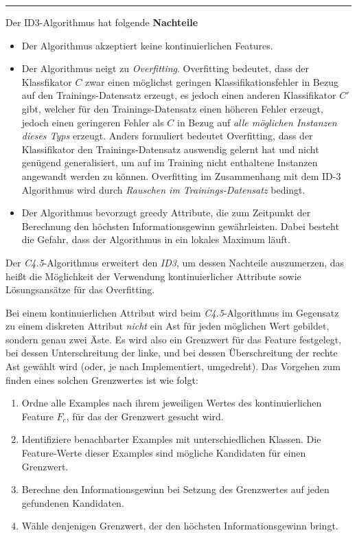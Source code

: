 \noindent\rule{\linewidth}{0.3pt}

\vspace{5mm}

Der ID3-Algorithmus hat folgende \textbf{Nachteile}
\begin{itemize}
\item Der Algorithmus akzeptiert keine kontinuierlichen Features.\cite[S. 72]{machine_mitchell}
\item Der Algorithmus neigt zu \emph{Overfitting}. Overfitting bedeutet, dass der Klassfikator $C$ zwar einen möglichst geringen Klassifikationsfehler in Bezug auf den Trainings-Datensatz erzeugt, es jedoch einen anderen Klassifikator $C'$ gibt, welcher für den Trainings-Datensatz einen höheren Fehler erzeugt, jedoch einen geringeren Fehler als $C$ in Bezug auf \emph{alle möglichen Instanzen dieses Typs} erzeugt. Anders formuliert bedeutet Overfitting, dass der Klassifikator den Trainings-Datensatz \glqq auswendig gelernt hat\grqq{} und nicht genügend generalisiert, um auf im Training nicht enthaltene Instanzen angewandt werden zu können. Overfitting im Zusammenhang mit dem ID-3 Algorithmus wird durch \emph{Rauschen im Trainings-Datensatz} bedingt.
\item Der Algorithmus bevorzugt greedy Attribute, die zum Zeitpunkt der Berechnung den höchsten Informationsgewinn gewährleisten. Dabei besteht die Gefahr, dass der Algorithmus in ein lokales Maximum läuft.\cite[S. 66 - 70]{machine_mitchell}
\end{itemize}

Der \emph{C4.5}-Algorithmus erweitert den \emph{ID3}, um dessen Nachteile auszumerzen, das heißt die Möglichkeit der Verwendung kontinuierlicher Attribute sowie Lösungsansätze für das Overfitting.

Bei einem kontinuierlichen Attribut wird beim \emph{C4.5}-Algorithmus im Gegensatz zu einem diskreten Attribut \emph{nicht} ein Ast für jeden möglichen Wert gebildet, sondern genau zwei Äste. Es wird also ein Grenzwert für das Feature festgelegt, bei dessen Unterschreitung der linke, und bei dessen Überschreitung der rechte Ast gewählt wird (oder, je nach Implementiert, umgedreht). Das Vorgehen zum finden eines solchen Grenzwertes ist wie folgt:

\begin{enumerate}
\item Ordne alle Examples nach ihrem jeweiligen Wertes des kontinuierlichen Feature $F_c$, für das der Grenzwert gesucht wird. 
\item Identifiziere benachbarter Examples mit unterschiedlichen Klassen. Die Feature-Werte dieser Examples sind mögliche Kandidaten für einen Grenzwert.
\item Berechne den Informationsgewinn bei Setzung des Grenzwertes auf jeden gefundenen Kandidaten. 
\item Wähle denjenigen Grenzwert, der den höchsten Informationsgewinn bringt. \cite[S. 73]{machine_mitchell}
\end{enumerate}

